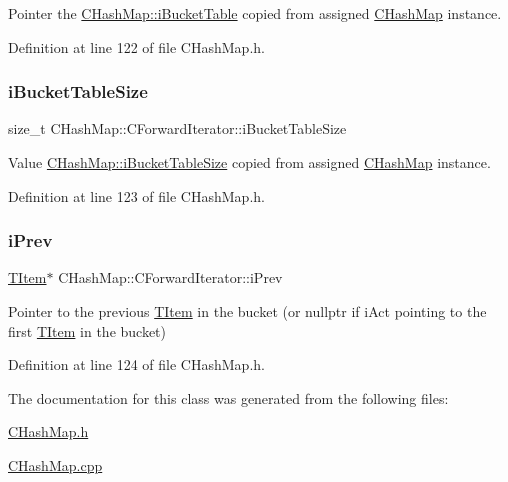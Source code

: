 Pointer the \hyperlink{class_c_hash_map_a1018fdaad71e8207e747db26e88025d6}{C\+Hash\+Map\+::i\+Bucket\+Table} copied from assigned \hyperlink{class_c_hash_map}{C\+Hash\+Map} instance. 



Definition at line 122 of file C\+Hash\+Map.\+h.

\mbox{\label{class_c_hash_map_1_1_c_forward_iterator_a9b715a364a2123ad7fd772a3341baad8}} 
\subsubsection{\texorpdfstring{i\+Bucket\+Table\+Size}{iBucketTableSize}}
{\footnotesize\ttfamily size\+\_\+t C\+Hash\+Map\+::\+C\+Forward\+Iterator\+::i\+Bucket\+Table\+Size\hspace{0.3cm}{\ttfamily [private]}}



Value \hyperlink{class_c_hash_map_a8745c6aa08e235500828dea0ad30b548}{C\+Hash\+Map\+::i\+Bucket\+Table\+Size} copied from assigned \hyperlink{class_c_hash_map}{C\+Hash\+Map} instance. 



Definition at line 123 of file C\+Hash\+Map.\+h.

\mbox{\label{class_c_hash_map_1_1_c_forward_iterator_a6b931e67da3ae68ef994208d5a0f3f47}} 
\subsubsection{\texorpdfstring{i\+Prev}{iPrev}}
{\footnotesize\ttfamily \hyperlink{struct_c_hash_map_1_1_t_item}{T\+Item}$\ast$ C\+Hash\+Map\+::\+C\+Forward\+Iterator\+::i\+Prev\hspace{0.3cm}{\ttfamily [private]}}



Pointer to the previous \hyperlink{struct_c_hash_map_1_1_t_item}{T\+Item} in the bucket (or nullptr if {\ttfamily i\+Act} pointing to the first \hyperlink{struct_c_hash_map_1_1_t_item}{T\+Item} in the bucket) 



Definition at line 124 of file C\+Hash\+Map.\+h.



The documentation for this class was generated from the following files\+:\begin{DoxyCompactItemize}
\item 
\hyperlink{_c_hash_map_8h}{C\+Hash\+Map.\+h}\item 
\hyperlink{_c_hash_map_8cpp}{C\+Hash\+Map.\+cpp}\end{DoxyCompactItemize}
